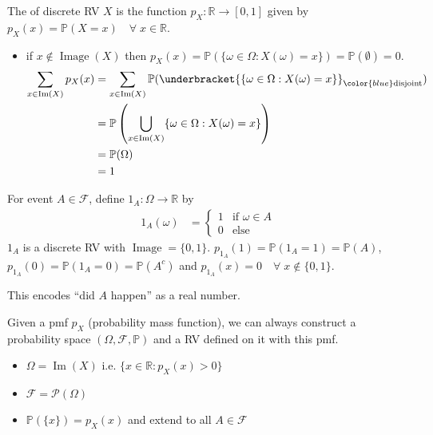 \begin{definition}
    The  of discrete RV $X$ is the function $p_X : \mathbb{R} \to [0, 1]$ given by $p_X(x) = \mathbb{P}(X = x) \quad \forall \; x \in \mathbb{R}$.
\end{definition} 

\begin{note} \mbox{}
    \begin{itemize}
        \item if $x \notin \operatorname{Image}(X)$ then $p_X(x) = \mathbb{P}(\{\omega \in \Omega : X(\omega) = x\}) = \mathbb{P}(\emptyset) = 0$.
        \mathitem
        \begin{align*}
            \sum_{x \in \operatorname{Im}(X)} p_X(x) &= \sum_{x \in \operatorname{Im}(X)} \mathbb{P}(\underbracket{\{\omega \in \Omega : X(\omega) = x\}}_{\color{blue} \text{disjoint}}) \\
            &= \mathbb{P}\left(\bigcup_{x \in \operatorname{Im}(X)} \{\omega \in \Omega : X(\omega) = x\} \right) \\
            &= \mathbb{P}(\Omega) \\
            &= 1
        \end{align*} 
    \end{itemize} 
\end{note} 
 
\begin{example}
    For event $A \in \mathcal{F}$, define $1_A : \Omega \to \mathbb{R}$ by 
    \begin{align*}
        1_A(\omega) &= \begin{cases}
            1 & \text{if } \omega \in A \\
            0 & \text{else }
        \end{cases}  
    \end{align*} 
    $1_A$ is a discrete RV with $\operatorname{Image} = \{0, 1\}$.
    $p_{1_A}(1) = \mathbb{P}(1_A = 1) = \mathbb{P}(A)$, $p_{1_A}(0) = \mathbb{P}(1_A = 0) = \mathbb{P}(A^c)$ and $p_{1_A}(x) = 0 \quad \forall \; x \notin \{0, 1\}$.

    \color{blue} This encodes ``did $A$ happen'' as a real number.
\end{example} 

\begin{remark}
    Given a pmf $p_X$ (probability mass function), we can always construct a probability space $(\Omega, \mathcal{F}, \mathbb{P})$ and a RV defined on it with this pmf.

    \color{blue}
    \begin{itemize}
        \item $\Omega = \operatorname{Im}(X)$ i.e. $\{x \in \mathbb{R} : p_X(x) > 0\}$
        \item $\mathcal{F} = \mathcal{P}(\Omega)$
        \item $\mathbb{P}(\{x\}) = p_X(x)$ and extend to all $A \in \mathcal{F}$
    \end{itemize} 
\end{remark} 


